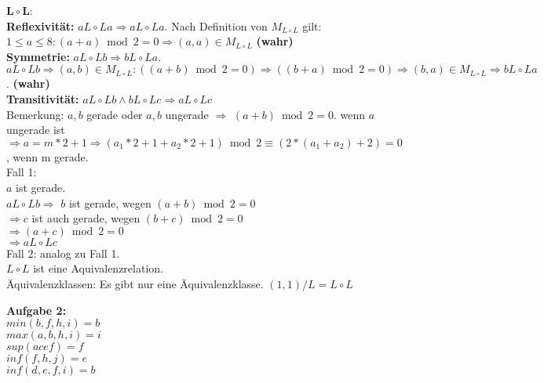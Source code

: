 \documentclass[a4paper]{scrartcl}
\begin{document}
\begin{flushleft}
		$\mathbf{L\circ L}$:\\
		\textbf{Reflexivität:} $aL\circ La\Rightarrow aL\circ La$. Nach Definition von $M_{L\circ L}$ gilt: $1\leq a\leq 8: (a+a)\bmod 2= 0\Rightarrow (a,a)\in M_{L\circ L}$ \textbf{(wahr)}\\
		\textbf{Symmetrie:} $aL\circ Lb\Rightarrow bL\circ La$.\\ $aL\circ Lb\Rightarrow (a,b)\in M_{L\circ L}:((a+b)\bmod 2 = 0)\Rightarrow((b+a)\bmod 2= 0)\Rightarrow(b,a)\in M_{L\circ L} \Rightarrow bL\circ La$. \textbf{(wahr)}\\
		\textbf{Transitivität:} $aL\circ Lb\wedge bL\circ Lc\Rightarrow aL\circ Lc$ \\
		Bemerkung: $a,b$ gerade oder $a,b$ ungerade $\Rightarrow$ $(a+b)\bmod 2= 0$. wenn $a$ ungerade ist $\Rightarrow a=m*2+1\Rightarrow (a_1*2+1 + a_2*2 + 1) \bmod 2\equiv (2*(a_1 + a_2) + 2) = 0$, wenn m gerade.\\
		Fall 1:\\
		$a$ ist gerade.\\
		$aL\circ Lb\Rightarrow$ $b$ ist gerade, wegen $(a+b)\bmod 2= 0$\\
		$\Rightarrow c$ ist auch gerade, wegen $(b+c)\bmod 2= 0$\\
		$\Rightarrow (a+c)\bmod 2 = 0$\\
		$\Rightarrow aL\circ Lc$\\
		Fall 2: analog zu Fall 1.\\
		$L\circ L$ ist eine Aquivalenzrelation.\\
		Äquivalenzklassen: Es gibt nur eine Äquivalenzklasse. $(1,1)/L=L\circ L$\\[1em]
	\end{flushleft}
	\begin{flushleft}
		\textbf{Aufgabe 2:}\\
		$min({b,f,h,i}) = b$\\
		$max({a,b,h,i}) = i$\\
		$sup({acef}) = f$\\
		$inf({f,h,j}) = e$\\
		$inf({d,e,f,i}) = b$\\[1em]
	\end{flushleft}
\end{document}
